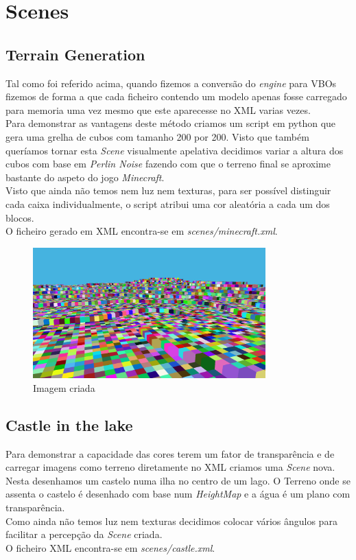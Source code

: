 \documentclass[a4paper]{report}
\begin{document}
\chapter{Scenes}
\section{Terrain Generation}
Tal como foi referido acima, quando fizemos a conversão do \textit{engine} para
VBOs fizemos de forma a que cada ficheiro contendo um modelo apenas fosse
carregado para memoria uma vez mesmo que este aparecesse no XML varias vezes.\\
Para demonstrar as vantagens deste método criamos um script em python que gera
uma grelha de cubos com tamanho 200 por 200. Visto que também queríamos tornar
esta \textit{Scene} visualmente apelativa decidimos variar a altura dos cubos com
base em \textit{Perlin Noise} fazendo com que o terreno final se aproxime
bastante do aspeto do jogo \textit{Minecraft}.\\
Visto que ainda não temos nem luz nem texturas, para ser possível distinguir
cada caixa individualmente, o script atribui uma cor aleatória a cada um dos
blocos.\\
O ficheiro gerado em XML encontra-se em \textit{scenes/minecraft.xml}.

\begin{figure}[H]
    \centering 
    \includegraphics[width=0.8\textwidth]{images/minecraft.png}  
    \caption{Imagem criada}
\end{figure}

\section{Castle in the lake}
Para demonstrar a capacidade das cores terem um fator de transparência e de
carregar imagens como terreno diretamente no XML criamos uma \textit{Scene}
nova. Nesta desenhamos um castelo numa ilha no centro de um lago. O Terreno onde
se assenta o castelo é desenhado com base num \textit{HeightMap} e a água é um
plano com transparência.\\
Como ainda não temos luz nem texturas decidimos colocar vários ângulos para
facilitar a percepção da \textit{Scene} criada.\\
O ficheiro XML encontra-se em \textit{scenes/castle.xml}.
\end{document}
